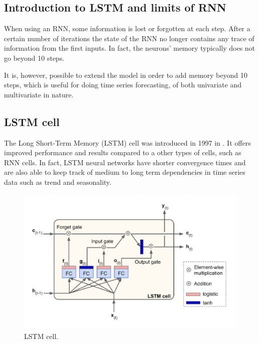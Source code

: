 \subsection{Introduction to LSTM and limits of RNN}
When using an RNN, some information is lost  or forgotten at each step. After a certain number of iterations the state of the RNN no longer contains any trace of information from the first inputs. In fact, the neurons' memory typically does not go beyond 10 steps.

It is, however, possible to extend the model in order to add memory beyond 10 steps, which is useful for doing time series forecasting, of both univariate and multivariate in nature.

\subsection{LSTM cell} \label{lstmcell}
The Long Short-Term Memory (LSTM) cell was introduced in 1997 in \citeauthor{LSTM} \autocite{LSTM}.
It offers improved performance and results compared to a other types of cells, such as RNN cells. In fact, LSTM neural networks have shorter convergence times and are also able to keep track of medium to long term dependencies in time series data such as trend and seasonality.

\begin{figure} [h!]
    \centering
    \includegraphics[width=\textwidth,height=\textheight,keepaspectratio]{Assets/Theory_and_methods/unnamed-8.png}
    \caption{LSTM cell.}
    \label{fig:LSTM_cell}
\end{figure}

